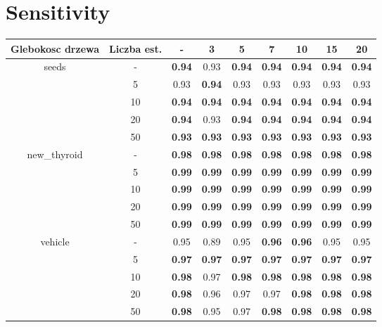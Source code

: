 \documentclass{article}%
\begin{document}
\section*{Sensitivity}%
\begin{tabular}{c|c|ccccccc}%
\hline%
Glebokosc drzewa&Liczba est.&{-}&3&5&7&10&15&20\\%
\hline%
\multirow{5}{*}{seeds}&{-}&\textbf{0.94}&0.93&\textbf{0.94}&\textbf{0.94}&\textbf{0.94}&\textbf{0.94}&\textbf{0.94}\\%
\cline{2%
-%
9}%
&5&0.93&\textbf{0.94}&0.93&0.93&0.93&0.93&0.93\\%
\cline{2%
-%
9}%
&10&\textbf{0.94}&\textbf{0.94}&\textbf{0.94}&\textbf{0.94}&\textbf{0.94}&\textbf{0.94}&\textbf{0.94}\\%
\cline{2%
-%
9}%
&20&\textbf{0.94}&0.93&\textbf{0.94}&\textbf{0.94}&\textbf{0.94}&\textbf{0.94}&\textbf{0.94}\\%
\cline{2%
-%
9}%
&50&\textbf{0.93}&\textbf{0.93}&\textbf{0.93}&\textbf{0.93}&\textbf{0.93}&\textbf{0.93}&\textbf{0.93}\\%
\hline%
\multirow{5}{*}{new\_thyroid}&{-}&\textbf{0.98}&\textbf{0.98}&\textbf{0.98}&\textbf{0.98}&\textbf{0.98}&\textbf{0.98}&\textbf{0.98}\\%
\cline{2%
-%
9}%
&5&\textbf{0.99}&\textbf{0.99}&\textbf{0.99}&\textbf{0.99}&\textbf{0.99}&\textbf{0.99}&\textbf{0.99}\\%
\cline{2%
-%
9}%
&10&\textbf{0.99}&\textbf{0.99}&\textbf{0.99}&\textbf{0.99}&\textbf{0.99}&\textbf{0.99}&\textbf{0.99}\\%
\cline{2%
-%
9}%
&20&\textbf{0.99}&\textbf{0.99}&\textbf{0.99}&\textbf{0.99}&\textbf{0.99}&\textbf{0.99}&\textbf{0.99}\\%
\cline{2%
-%
9}%
&50&\textbf{0.99}&\textbf{0.99}&\textbf{0.99}&\textbf{0.99}&\textbf{0.99}&\textbf{0.99}&\textbf{0.99}\\%
\hline%
\multirow{5}{*}{vehicle}&{-}&0.95&0.89&0.95&\textbf{0.96}&\textbf{0.96}&0.95&0.95\\%
\cline{2%
-%
9}%
&5&\textbf{0.97}&\textbf{0.97}&\textbf{0.97}&\textbf{0.97}&\textbf{0.97}&\textbf{0.97}&\textbf{0.97}\\%
\cline{2%
-%
9}%
&10&\textbf{0.98}&0.97&\textbf{0.98}&\textbf{0.98}&\textbf{0.98}&\textbf{0.98}&\textbf{0.98}\\%
\cline{2%
-%
9}%
&20&\textbf{0.98}&0.96&0.97&0.97&\textbf{0.98}&\textbf{0.98}&\textbf{0.98}\\%
\cline{2%
-%
9}%
&50&\textbf{0.98}&0.95&0.97&\textbf{0.98}&\textbf{0.98}&\textbf{0.98}&\textbf{0.98}\\%

\end{tabular}
\end{document}
